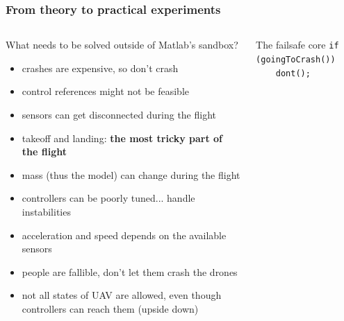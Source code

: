 \documentclass[aspectratio=1610]{beamer}
\begin{document}
\begin{frame}
\begin{columns}[c]


  \end{columns}

\end{frame}


\begin{frame}
  \frametitle{From theory to practical experiments}

  \begin{columns}[c]

    \begin{block}{What needs to be solved outside of Matlab's sandbox?}
      \begin{itemize}
        \item crashes are expensive, so don't crash
        \item control references might not be feasible
        \item sensors can get disconnected during the flight
        \item takeoff and landing: \textbf{the most tricky part of the flight}
        \item mass (thus the model) can change during the flight
        \item controllers can be poorly tuned... handle instabilities
        \item acceleration and speed depends on the available sensors
        \item people are fallible, don't let them crash the drones
        \item not all states of UAV are allowed, even though controllers can reach them (upside down)
      \end{itemize}
    \end{block}

    \begin{block}{The failsafe core}
      \texttt{if (goingToCrash())}\\
      \texttt{~~~~dont();}
    \end{block}

  \end{columns}

\end{frame}
\end{document}

